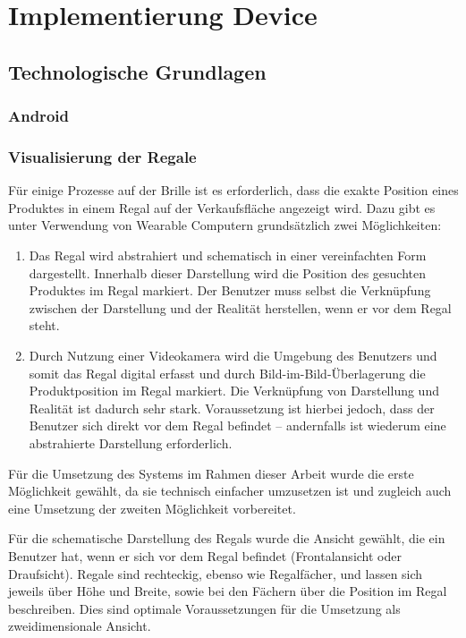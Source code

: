 \chapter{Implementierung Device}
\label{cha:impl_device}

\section{Technologische Grundlagen}
\subsection{Android}

\subsection{Visualisierung der Regale}
Für einige Prozesse auf der Brille ist es erforderlich, dass die exakte Position eines Produktes in einem Regal auf der Verkaufsfläche angezeigt wird. Dazu gibt es unter Verwendung von Wearable Computern grundsätzlich zwei Möglichkeiten:

\begin{enumerate}
	\item Das Regal wird abstrahiert und schematisch in einer vereinfachten Form dargestellt. Innerhalb dieser Darstellung wird die Position des gesuchten Produktes im Regal markiert. Der Benutzer muss selbst die Verknüpfung zwischen der Darstellung und der Realität herstellen, wenn er vor dem Regal steht.
	\item Durch Nutzung einer Videokamera wird die Umgebung des Benutzers und somit das Regal digital erfasst und durch Bild-im-Bild-Überlagerung die Produktposition im Regal markiert. Die Verknüpfung von Darstellung und Realität ist dadurch sehr stark. Voraussetzung ist hierbei jedoch, dass der Benutzer sich direkt vor dem Regal befindet -- andernfalls ist wiederum eine abstrahierte Darstellung erforderlich.
\end{enumerate}

Für die Umsetzung des Systems im Rahmen dieser Arbeit wurde die erste Möglichkeit gewählt, da sie technisch einfacher umzusetzen ist und zugleich auch eine Umsetzung der zweiten Möglichkeit vorbereitet.

Für die schematische Darstellung des Regals wurde die Ansicht gewählt, die ein Benutzer hat, wenn er sich vor dem Regal befindet (Frontalansicht oder Draufsicht). Regale sind rechteckig, ebenso wie Regalfächer, und lassen sich jeweils über Höhe und Breite, sowie bei den Fächern über die Position im Regal beschreiben. Dies sind optimale Voraussetzungen für die Umsetzung als zweidimensionale Ansicht.

